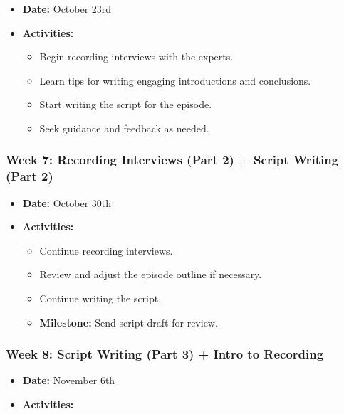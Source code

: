 \documentclass[
  letterpaper,
  DIV=11,
  numbers=noendperiod]{scrreprt}
\providecommand{\tightlist}{%
  \setlength{\itemsep}{0pt}\setlength{\parskip}{0pt}}\usepackage{longtable,booktabs,array}
\begin{document}
\begin{tcolorbox}
\begin{itemize}
\tightlist
\item
  \textbf{Date:} October 23rd
\item
  \textbf{Activities:}

  \begin{itemize}
  \tightlist
  \item
    Begin recording interviews with the experts.
  \item
    Learn tips for writing engaging introductions and conclusions.
  \item
    Start writing the script for the episode.
  \item
    Seek guidance and feedback as needed.
  \end{itemize}
\end{itemize}

\subsubsection{Week 7: Recording Interviews (Part 2) + Script Writing
(Part
2)}\label{week-7-recording-interviews-part-2-script-writing-part-2}

\begin{itemize}
\tightlist
\item
  \textbf{Date:} October 30th
\item
  \textbf{Activities:}

  \begin{itemize}
  \tightlist
  \item
    Continue recording interviews.
  \item
    Review and adjust the episode outline if necessary.
  \item
    Continue writing the script.
  \item
    \textbf{Milestone:} Send script draft for review.
  \end{itemize}
\end{itemize}

\subsubsection{Week 8: Script Writing (Part 3) + Intro to
Recording}\label{week-8-script-writing-part-3-intro-to-recording}

\begin{itemize}
\tightlist
\item
  \textbf{Date:} November 6th
\item
  \textbf{Activities:}


\end{itemize}
\end{tcolorbox}
\end{document}
